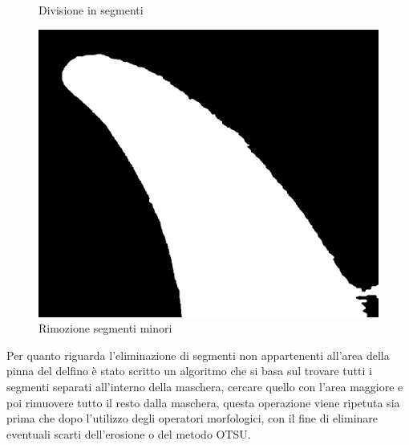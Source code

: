 \documentclass[a4paper,12pt]{report}
\begin{document}
\begin{figure}[H]
\begin{minipage}{0.3\textwidth}
          \caption{Divisione in segmenti}
        \end{minipage}
        \begin{minipage}{0.3\textwidth}
          \centering
          \includegraphics[width=\textwidth]{assets/images/methods/porting/alg_area/clear.png}   
          \caption{Rimozione segmenti minori}
        \end{minipage}
      \end{figure}
     
      Per quanto riguarda l'eliminazione di segmenti non appartenenti all'area della pinna del delfino
      è stato scritto un algoritmo che si basa sul trovare tutti i segmenti separati all'interno della maschera,
      cercare quello con l'area maggiore e poi rimuovere tutto il resto dalla maschera, 
      questa operazione viene ripetuta sia prima che dopo l'utilizzo degli operatori morfologici, con il fine di
      eliminare eventuali scarti dell'erosione o del metodo OTSU.
      \newpage
\end{document}
